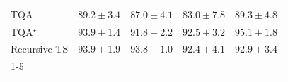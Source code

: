 \begin{tabular}{l|cccc|}
TQA & {\cellcolor[HTML]{4A98C5}} \color[HTML]{F1F1F1} $89.2\pm 3.4$ & {\cellcolor[HTML]{80AED2}} \color[HTML]{F1F1F1} $87.0\pm 4.1$ & {\cellcolor[HTML]{C9CEE4}} \color[HTML]{000000} $83.0\pm 7.8$ & {\cellcolor[HTML]{4897C4}} \color[HTML]{F1F1F1} $89.3\pm 4.8$ \\
TQA$^\star$ & {\cellcolor[HTML]{04649D}} \color[HTML]{F1F1F1} $93.9\pm 1.4$ & {\cellcolor[HTML]{1379B5}} \color[HTML]{F1F1F1} $91.8\pm 2.2$ & {\cellcolor[HTML]{0570B0}} \color[HTML]{F1F1F1} $92.5\pm 3.2$ & {\cellcolor[HTML]{04588A}} \color[HTML]{F1F1F1} $95.1\pm 1.8$ \\
Recursive TS & {\cellcolor[HTML]{04649D}} \color[HTML]{F1F1F1} $93.9\pm 1.9$ & {\cellcolor[HTML]{04649E}} \color[HTML]{F1F1F1} $93.8\pm 1.0$ & {\cellcolor[HTML]{0771B1}} \color[HTML]{F1F1F1} $92.4\pm 4.1$ & {\cellcolor[HTML]{056DAB}} \color[HTML]{F1F1F1} $92.9\pm 3.4$ \\
\cline{1-5}
\bottomrule
\end{tabular}
